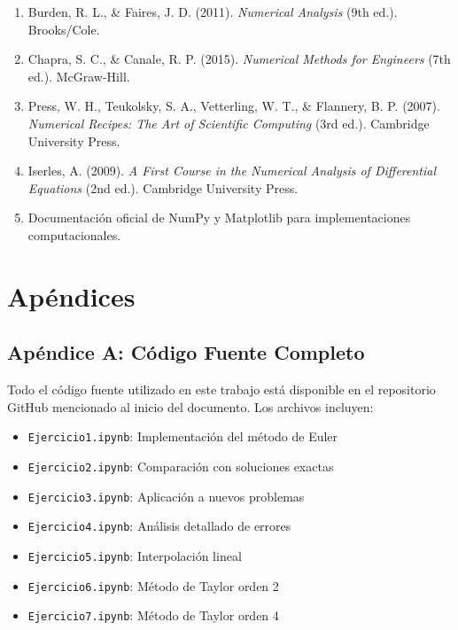 \documentclass[12pt,a4paper]{article}
\begin{document}
\begin{enumerate}
    \item Burden, R. L., \& Faires, J. D. (2011). \textit{Numerical Analysis} (9th ed.). Brooks/Cole.
    
    \item Chapra, S. C., \& Canale, R. P. (2015). \textit{Numerical Methods for Engineers} (7th ed.). McGraw-Hill.
    
    \item Press, W. H., Teukolsky, S. A., Vetterling, W. T., \& Flannery, B. P. (2007). \textit{Numerical Recipes: The Art of Scientific Computing} (3rd ed.). Cambridge University Press.
    
    \item Iserles, A. (2009). \textit{A First Course in the Numerical Analysis of Differential Equations} (2nd ed.). Cambridge University Press.
    
    \item Documentación oficial de NumPy y Matplotlib para implementaciones computacionales.
\end{enumerate}

\section{Apéndices}

\subsection{Apéndice A: Código Fuente Completo}

Todo el código fuente utilizado en este trabajo está disponible en el repositorio GitHub mencionado al inicio del documento. Los archivos incluyen:

\begin{itemize}
    \item \texttt{Ejercicio1.ipynb}: Implementación del método de Euler
    \item \texttt{Ejercicio2.ipynb}: Comparación con soluciones exactas
    \item \texttt{Ejercicio3.ipynb}: Aplicación a nuevos problemas
    \item \texttt{Ejercicio4.ipynb}: Análisis detallado de errores
    \item \texttt{Ejercicio5.ipynb}: Interpolación lineal
    \item \texttt{Ejercicio6.ipynb}: Método de Taylor orden 2
    \item \texttt{Ejercicio7.ipynb}: Método de Taylor orden 4
\end{itemize}
\end{document}

